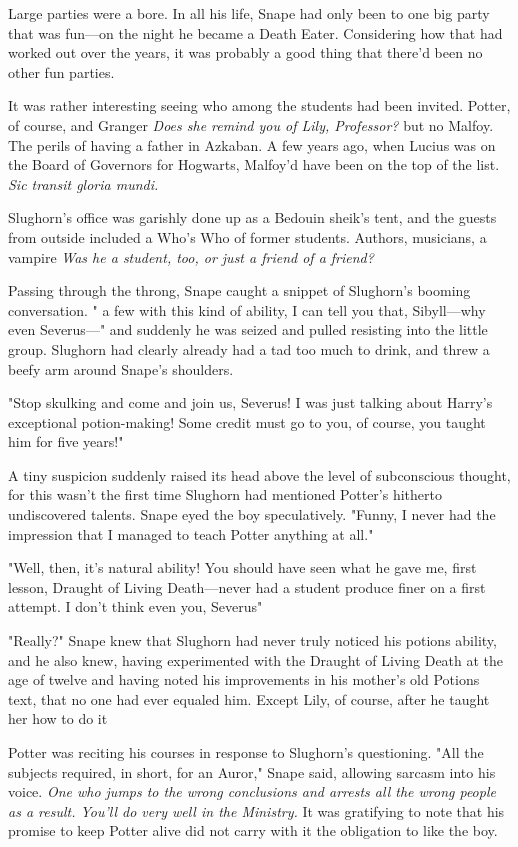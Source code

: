 Large parties were a bore. In all his life, Snape had only been to one big party that was fun—on the night he became a Death Eater. Considering how that had worked out over the years, it was probably a good thing that there'd been no other fun parties.

It was rather interesting seeing who among the students had been invited. Potter, of course, and Granger{\el} \emph{Does she remind you of Lily, Professor?{\el}} but no Malfoy. The perils of having a father in Azkaban. A few years ago, when Lucius was on the Board of Governors for Hogwarts, Malfoy'd have been on the top of the list. \emph{Sic transit gloria mundi.}

Slughorn's office was garishly done up as a Bedouin sheik's tent, and the guests from outside included a Who's Who of former students. Authors, musicians, a vampire{\el} \emph{Was he a student, too, or just a friend of a friend?}

Passing through the throng, Snape caught a snippet of Slughorn's booming conversation. "{\el} a few with this kind of ability, I can tell you that, Sibyll—why even Severus—" and suddenly he was seized and pulled resisting into the little group. Slughorn had clearly already had a tad too much to drink, and threw a beefy arm around Snape's shoulders.

"Stop skulking and come and join us, Severus! I was just talking about Harry's exceptional potion-making! Some credit must go to you, of course, you taught him for five years!"

A tiny suspicion suddenly raised its head above the level of subconscious thought, for this wasn't the first time Slughorn had mentioned Potter's hitherto undiscovered talents. Snape eyed the boy speculatively. "Funny, I never had the impression that I managed to teach Potter anything at all."

"Well, then, it's natural ability! You should have seen what he gave me, first lesson, Draught of Living Death—never had a student produce finer on a first attempt. I don't think even you, Severus{\el}"

"Really?" Snape knew that Slughorn had never truly noticed his potions ability, and he also knew, having experimented with the Draught of Living Death at the age of twelve and having noted his improvements in his mother's old Potions text, that no one had ever equaled him. Except Lily, of course, after he taught her how to do it{\el}

Potter was reciting his courses in response to Slughorn's questioning. "All the subjects required, in short, for an Auror," Snape said, allowing sarcasm into his voice. \emph{One who jumps to the wrong conclusions and arrests all the wrong people as a result. You'll do very well in the Ministry.} It was gratifying to note that his promise to keep Potter alive did not carry with it the obligation to like the boy.

